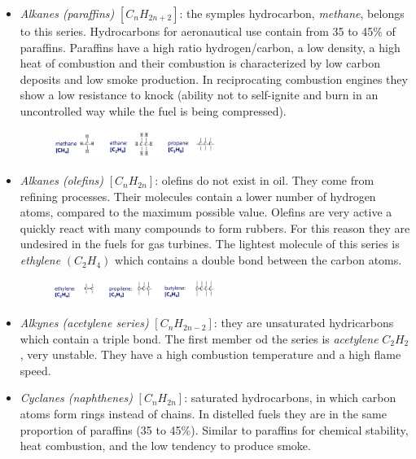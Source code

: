 \documentclass[12pt]{article}
\begin{document}
\begin{itemize}
    \item \textit{Alkanes (paraffins)} $[C_{n}H_{2n+2}]$: the symples hydrocarbon, \textit{methane}, belongs to this series. Hydrocarbons for aeronautical use contain from 35 to 45\% of paraffins. Paraffins have a high ratio hydrogen/carbon, a low density, a high heat of combustion and their combustion is characterized by low carbon deposits and low smoke production. In reciprocating combustion engines they show a low resistance to knock (ability not to self-ignite and burn in an uncontrolled way while the fuel is being compressed).

\begin{figure}[!ht]
\centering
\includegraphics[width=0.5\textwidth]{figures/paraffins.png}
\end{figure}

    \item \textit{Alkanes (olefins)} $[C_{n}H_{2n}]$: olefins do not exist in oil. They come from refining processes. Their molecules contain a lower number of hydrogen atoms, compared to the maximum possible value. Olefins are very active a quickly react with many compounds to form rubbers. For this reason they are undesired in the fuels for gas turbines. The lightest molecule of this series is \textit{ethylene} $(C_{2}H_{4})$ which contains a double bond between the carbon atoms.

\begin{figure}[!ht]
\centering
\includegraphics[width=0.5\textwidth]{figures/olefins.png}
\end{figure}

    \item \textit{Alkynes (acetylene series)} $[C_{n}H_{2n-2}]$: they are unsaturated hydricarbons which contain a triple bond. The first member od the series is \textit{acetylene} $C_{2}H_{2}$, very unstable. They have a high combustion temperature and a high flame speed.
    \item \textit{Cyclanes (naphthenes)} $[C_{n}H_{2n}]$: saturated hydrocarbons, in which carbon atoms form rings instead of chains. In distelled fuels they are in the same proportion of paraffins (35 to 45\%). Similar to paraffins for chemical stability, heat combustion, and the low tendency to produce smoke.


\end{itemize}
\end{document}
